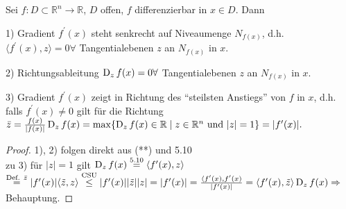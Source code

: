\begin{satz}
    Sei $f: D \subset \mathbb{R}^n \to \mathbb{R}$, $D$ offen, $f$ differenzierbar in $x \in D$. Dann
    \begin{compactitem}
        \item[1)] Gradient $f^{\prime}(x)$ steht senkrecht auf Niveaumenge $N_{f(x)}$, d.h. $\langle f^{\prime}(x), z\rangle = 0 \forall$ Tangentialebenen $z$ an $N_{f(x)}$ in $x$.
        \item[2)] Richtungsableitung $\operatorname{D}_z f(x) = 0 \forall$ Tangentialebenen $z$ an $N_{f(x)}$ in $x$.
        \item[3)] Gradient $f^{\prime}(x)$ zeigt in Richtung des ``steilsten Anstiegs'' von $f$ in $x$, d.h. falls $f^{\prime}(x) \neq 0$ gilt für die Richtung $\bar{z} = \frac{f(x)}{\vert f(x) \vert} \operatorname{D}_z f(x) = \max\{\operatorname{D}_z f(x) \in \mathbb{R} \mid z \in \mathbb{R}^n \text{ und } \vert z \vert = 1\} = \vert f^{\prime}(x)\vert.$
    \end{compactitem}
\end{satz}

\begin{proof}
    1), 2) folgen direkt aus (**) und 5.10\\
    zu 3) für $\vert z \vert = 1$ gilt $\operatorname{D}_z f(x) \overset{5.10}{=} \langle f^{\prime}(x), z \rangle$ $\overset{\text{Def. } \bar{z}}{=} \vert f^{\prime}(x)\vert \langle \tilde{z}, z\rangle \overset{\text{CSU}}{\leq} \vert f^{\prime}(x)\vert \vert \tilde{z}\vert \vert z\vert = \vert f^{\prime}(x)\vert = \frac{\langle f^{\prime}(x),f^{\prime}(x)}{\vert f^{\prime}(x) \vert} = \langle f^{\prime}(x), \tilde{z}\rangle \operatorname{D}_z f(x) \Rightarrow$ Behauptung. %
\end{proof}